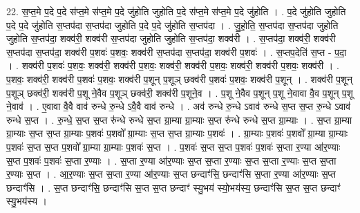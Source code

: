 \documentclass[17pt]{extarticle}
\begin{document}
22. स॒प्त॒मे प॒दे प॒दे स॑प्त॒मे स॑प्त॒मे प॒दे जु॑होति जुहोति प॒दे स॑प्त॒मे स॑प्त॒मे प॒दे जु॑होति । . प॒दे जु॑होति जुहोति प॒दे प॒दे जु॑होति स॒प्तप॑दा स॒प्तप॑दा जुहोति प॒दे प॒दे जु॑होति स॒प्तप॑दा । . जु॒हो॒ति॒ स॒प्तप॑दा स॒प्तप॑दा जुहोति जुहोति स॒प्तप॑दा॒ शक्व॑री॒ शक्व॑री स॒प्तप॑दा जुहोति जुहोति स॒प्तप॑दा॒ शक्व॑री । . स॒प्तप॑दा॒ शक्व॑री॒ शक्व॑री स॒प्तप॑दा स॒प्तप॑दा॒ शक्व॑री प॒शवः॑ प॒शवः॒ शक्व॑री स॒प्तप॑दा स॒प्तप॑दा॒ शक्व॑री प॒शवः॑ । . स॒प्तप॒देति॑ स॒प्त - प॒दा॒ । . शक्व॑री प॒शवः॑ प॒शवः॒ शक्व॑री॒ शक्व॑री प॒शवः॒ शक्व॑री॒ शक्व॑री प॒शवः॒ शक्व॑री॒ शक्व॑री प॒शवः॒ शक्व॑री । . प॒शवः॒ शक्व॑री॒ शक्व॑री प॒शवः॑ प॒शवः॒ शक्व॑री प॒शून् प॒शूञ् छक्व॑री प॒शवः॑ प॒शवः॒ शक्व॑री प॒शून् । . शक्व॑री प॒शून् प॒शूञ् छक्व॑री॒ शक्व॑री प॒शू ने॒वैव प॒शूञ् छक्व॑री॒ शक्व॑री प॒शूने॒व । . प॒शू ने॒वैव प॒शून् प॒शू ने॒वावा वै॒व प॒शून् प॒शू ने॒वाव॑ । . ए॒वावा वै॒वै वाव॑ रुन्धे रु॒न्धे ऽवै॒वै वाव॑ रुन्धे । . अव॑ रुन्धे रु॒न्धे ऽवाव॑ रुन्धे स॒प्त स॒प्त रु॒न्धे ऽवाव॑ रुन्धे स॒प्त । . रु॒न्धे॒ स॒प्त स॒प्त रु॑न्धे रुन्धे स॒प्त ग्रा॒म्या ग्रा॒म्याः स॒प्त रु॑न्धे रुन्धे स॒प्त ग्रा॒म्याः । . स॒प्त ग्रा॒म्या ग्रा॒म्याः स॒प्त स॒प्त ग्रा॒म्याः प॒शवः॑ प॒शवो᳚ ग्रा॒म्याः स॒प्त स॒प्त ग्रा॒म्याः प॒शवः॑ । . ग्रा॒म्याः प॒शवः॑ प॒शवो᳚ ग्रा॒म्या ग्रा॒म्याः प॒शवः॑ स॒प्त स॒प्त प॒शवो᳚ ग्रा॒म्या ग्रा॒म्याः प॒शवः॑ स॒प्त । . प॒शवः॑ स॒प्त स॒प्त प॒शवः॑ प॒शवः॑ स॒प्ता र॒ण्या आ॑र॒ण्याः स॒प्त प॒शवः॑ प॒शवः॑ स॒प्ता र॒ण्याः । . स॒प्ता र॒ण्या आ॑र॒ण्याः स॒प्त स॒प्ता र॒ण्याः स॒प्त स॒प्ता र॒ण्याः स॒प्त स॒प्ता र॒ण्याः स॒प्त । . आ॒र॒ण्याः स॒प्त स॒प्ता र॒ण्या आ॑र॒ण्याः स॒प्त छन्दाꣳ॑सि॒ छन्दाꣳ॑सि स॒प्ता र॒ण्या आ॑र॒ण्याः स॒प्त छन्दाꣳ॑सि । . स॒प्त छन्दाꣳ॑सि॒ छन्दाꣳ॑सि स॒प्त स॒प्त छन्दाꣳ॑ स्यु॒भय॑ स्यो॒भय॑स्य॒ छन्दाꣳ॑सि स॒प्त स॒प्त छन्दाꣳ॑ स्यु॒भय॑स्य । \newline
\end{document}
